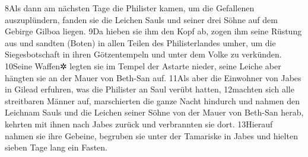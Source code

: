 8Als dann am nächsten Tage die Philister kamen, um die Gefallenen
auszuplündern, fanden sie die Leichen Sauls und seiner drei Söhne auf
dem Gebirge Gilboa liegen. 9Da hieben sie ihm den Kopf ab, zogen ihm
seine Rüstung aus und sandten (Boten) in allen Teilen des
Philisterlandes umher, um die Siegesbotschaft in ihren Götzentempeln und
unter dem Volke zu verkünden. 10Seine Waffen✲ legten sie im Tempel der
Astarte nieder, seine Leiche aber hängten sie an der Mauer von Beth-San
auf. 11Als aber die Einwohner von Jabes in Gilead erfuhren, was die
Philister an Saul verübt hatten, 12machten sich alle streitbaren Männer
auf, marschierten die ganze Nacht hindurch und nahmen den Leichnam Sauls
und die Leichen seiner Söhne von der Mauer von Beth-San herab, kehrten
mit ihnen nach Jabes zurück und verbrannten sie dort. 13Hierauf nahmen
sie ihre Gebeine, begruben sie unter der Tamariske in Jabes und hielten
sieben Tage lang ein Fasten.
